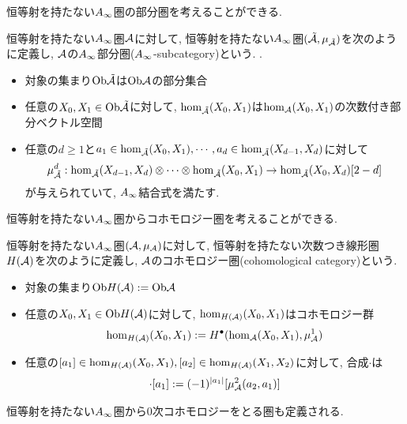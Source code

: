 \documentclass[uplatex, a4paper, 14Q, dvipdfmx]{jsarticle}
\begin{document}
恒等射を持たない$A_{\infty}$圏の部分圏を考えることができる. 

\begin{definition}
  恒等射を持たない$A_{\infty}$圏$\mathcal{A}$に対して, 恒等射を持たない$A_{\infty}$圏$(\tilde{\mathcal{A}},\mu_{\tilde{\mathcal{A}}})$を次のように定義し, $\mathcal{A}$の$A_{\infty}$部分圏($A_{\infty}$-subcategory)という. . 
  \begin{itemize}
    \item 対象の集まり$\mathrm{Ob}\tilde{\mathcal{A}}$は$\mathrm{Ob}\mathcal{A}$の部分集合
    \item 任意の$X_0,X_1 \in \mathrm{Ob}\tilde{\mathcal{A}}$に対して, $\hom_{\tilde{\mathcal{A}}}(X_0,X_1)$は$\hom_{\mathcal{A}}(X_0,X_1)$の次数付き部分ベクトル空間
    \item 任意の$d \geq 1$と$a_1 \in \hom_{\tilde{\mathcal{A}}}(X_0,X_1), \cdots, a_d \in \hom_{\tilde{\mathcal{A}}}(X_{d-1},X_d)$に対して
    \begin{align*}
      \mu^d_{\tilde{\mathcal{A}}} : \hom_{\tilde{\mathcal{A}}}(X_{d-1},X_d) \otimes \cdots \otimes \hom_{\tilde{\mathcal{A}}}(X_0,X_1) \to \hom_{\tilde{\mathcal{A}}}(X_0,X_d)[2-d]
    \end{align*}
    が与えられていて, $A_{\infty}$結合式を満たす. 
  \end{itemize}
\end{definition}

恒等射を持たない$A_{\infty}$圏からコホモロジー圏を考えることができる. 

\begin{definition}[コホモロジー圏]
  恒等射を持たない$A_{\infty}$圏$(\mathcal{A},\mu_{\mathcal{A}})$に対して, 恒等射を持たない次数つき線形圏$H(\mathcal{A})$を次のように定義し, $\mathcal{A}$のコホモロジー圏(cohomological category)という.
  \begin{itemize}
    \item 対象の集まり$ \mathrm{Ob} H(\mathcal{A}) := \mathrm{Ob}\mathcal{A}$
    \item 任意の$X_0, X_1 \in \mathrm{Ob} H(\mathcal{A})$に対して, $\hom_{H(\mathcal{A})}(X_0,X_1)$はコホモロジー群
    \begin{align*}
      \hom_{H(\mathcal{A})}(X_0,X_1) := H^\bullet(\hom_{\mathcal{A}}(X_0,X_1), \mu^1_{\mathcal{A}})
    \end{align*}
    \item 任意の$[a_1] \in \hom_{H(\mathcal{A})}(X_0,X_1), [a_2] \in \hom_{H(\mathcal{A})}(X_1,X_2)$に対して, 合成$\cdot$は
    \begin{align*}
      [a_2] \cdot [a_1] := (-1)^{|a_1|} [\mu^2_\A(a_2,a_1)]
    \end{align*}
  \end{itemize}
\end{definition}

恒等射を持たない$A_{\infty}$圏から$0$次コホモロジーをとる圏も定義される. 
\end{document}
